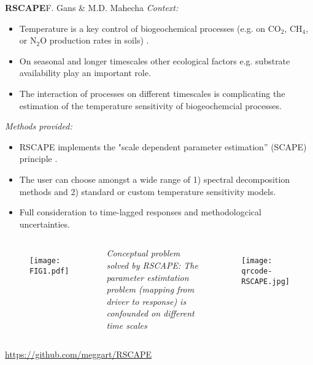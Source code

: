 \documentclass[final,hyperref={pdfpagelabels=false}, professionalmath, mathserif, 11pt]{beamer}
\begin{document}
\begin{frame}
\begin{columns}
\begin{column}{.48\textwidth}
\begin{center}
\begin{minipage}[T]{.95\textwidth}
{\begin{block}{\textbf{RSCAPE}\hfill\normalsize{F. Gans \& M.D. Mahecha}}
\alert{\textit{Context:}}
\begin{itemize}
	\item Temperature is a key control of biogeochemical processes (e.g. on CO$_2$, CH$_4$, or N$_2$O production rates in soils) .
	\item On seasonal and longer timescales other ecological factors e.g. substrate availability play an important role.
	\item The interaction of processes on different timescales is complicating the estimation of the temperature sensitivity of biogeochemcial processes.
\end{itemize}
 
\alert{\textit{Methods provided:}}
\begin{itemize}
	\item RSCAPE implements the "scale dependent parameter estimation” (SCAPE) principle \citep{MAHECHAetal2010b}.
    \item The user can choose amongst a wide range of 1) spectral decomposition methods and 2) standard or custom temperature sensitivity models.
    \item Full consideration to time-lagged responses and methodologcical uncertainties.
\end{itemize}
\vspace{1cm}
\begin{columns}
	\begin{figure}[tb]
	\begin{center}
		\texttt{[image: FIG1.pdf]}
	\end{center}
	\end{figure}
\small{\textit{Conceptual problem solved by RSCAPE: The parameter estimtation problem (mapping from driver to response) is confounded on different time scales}}
\vspace{4cm}
	\begin{figure}[tb]
		\texttt{[image: qrcode-RSCAPE.jpg]}
	\end{figure}
\end{columns}
\vspace{1cm}
\hfill\large{\url{https://github.com/meggart/RSCAPE}}
\end{block}


\vfill

}

         
			          

\end{minipage}
\end{center}
\end{column}
\end{columns}
\end{frame}
\end{document}
